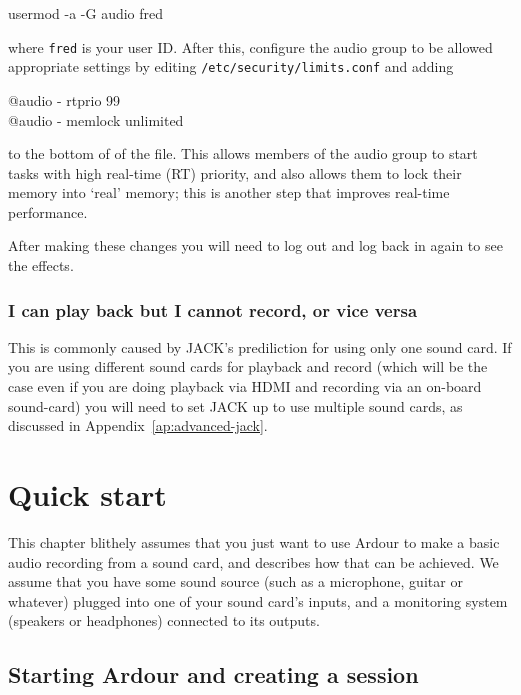 \documentclass[10pt,a4paper]{book}
\begin{document}
\begin{listing}
usermod -a -G audio fred
\end{listing}

where \texttt{fred} is your user ID\@.  After this, configure the audio
group to be allowed appropriate settings by editing
\texttt{/etc/security/limits.conf} and adding

\begin{listing}
@audio - rtprio 99\\
@audio - memlock unlimited
\end{listing}

to the bottom of of the file.  This allows members of the audio group
to start tasks with high real-time (RT) priority, and also allows them
to lock their memory into `real' memory; this is another step that
improves real-time performance.

After making these changes you will need to log out and log back in
again to see the effects.


\subsection{I can play back but I cannot record, or vice versa}

This is commonly caused by JACK's prediliction for using only
one sound card.  If you are using different sound cards for playback
and record (which will be the case even if you are doing playback via
HDMI and recording via an on-board sound-card) you will need to set
JACK up to use multiple sound cards, as discussed in
Appendix~\ref{ap:advanced-jack}.


\chapter{Quick start}

This chapter blithely assumes that you just want to use Ardour to make
a basic audio recording from a sound card, and describes how that can
be achieved.  We assume that you have some sound source (such as a
microphone, guitar or whatever) plugged into one of your sound card's
inputs, and a monitoring system (speakers or headphones) connected to
its outputs.

\section{Starting Ardour and creating a session}
\end{document}
